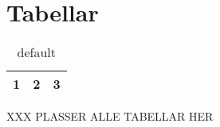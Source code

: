 \section{Tabellar}

\begin{table}[htdp]
\begin{center}
\begin{tabular}{| c | c | c |}
\hline
1 & 2 & 3 \\
\hline
\end{tabular}
\end{center}
\caption{default}
\label{tab:referanse}
\end{table}%

XXX PLASSER ALLE TABELLAR HER
